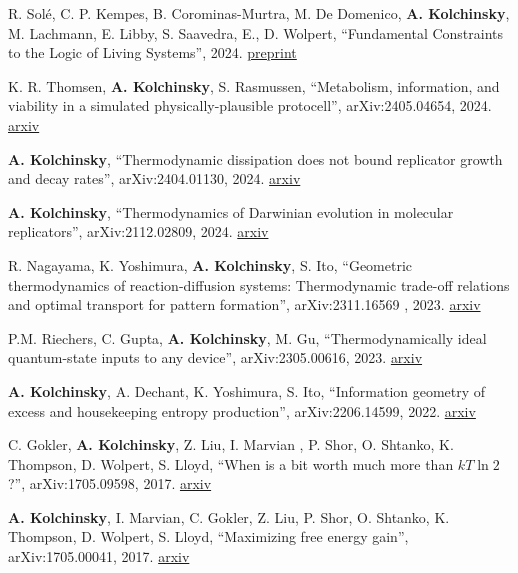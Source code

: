 
R. Solé, C. P. Kempes, B. Corominas-Murtra, M. De Domenico, \textbf{A. Kolchinsky}, M. Lachmann, E. Libby, S. Saavedra, E., D. Wolpert, ``Fundamental Constraints to the Logic of Living Systems'', 2024. \href{https://www.preprints.org/manuscript/202406.0891/v1}{preprint}

K. R. Thomsen, \textbf{A. Kolchinsky}, S. Rasmussen, ``Metabolism, information, and viability in a simulated physically-plausible protocell'', arXiv:2405.04654, 2024. \href{http://arxiv.org/abs/2405.04654}{arxiv}

\textbf{A. Kolchinsky}, ``Thermodynamic dissipation does not bound replicator growth and decay rates'', arXiv:2404.01130, 2024. \href{http://arxiv.org/abs/2404.01130}{arxiv} 

\textbf{A. Kolchinsky}, ``Thermodynamics of Darwinian evolution in molecular replicators'', arXiv:2112.02809, 2024. \href{http://arxiv.org/abs/2112.02809}{arxiv} 

R. Nagayama, K. Yoshimura, \textbf{A. Kolchinsky}, S. Ito, ``Geometric thermodynamics of reaction-diffusion systems: Thermodynamic trade-off relations and optimal transport for pattern formation'', arXiv:2311.16569 , 2023. \href{https://arxiv.org/abs/2311.16569}{arxiv}
 
P.M. Riechers, C. Gupta, \textbf{A. Kolchinsky}, M. Gu, ``Thermodynamically ideal quantum-state inputs to any device'', arXiv:2305.00616, 2023. \href{http://arxiv.org/abs/2305.00616}{arxiv}

\textbf{A. Kolchinsky}, A. Dechant, K. Yoshimura, S. Ito, 
``Information geometry of excess and housekeeping entropy production'', arXiv:2206.14599, 2022. \href{https://arxiv.org/abs/2206.14599}{arxiv}

C. Gokler, \textbf{A. Kolchinsky}, Z. Liu, I. Marvian , P. Shor, O. Shtanko, K. Thompson, D. Wolpert, S. Lloyd, ``When is a bit worth much more than $kT \ln 2$?'', arXiv:1705.09598, 2017. \href{https://arxiv.org/abs/1705.09598}{arxiv}

\textbf{A. Kolchinsky}, I. Marvian, C. Gokler, Z. Liu, P. Shor, O. Shtanko, K. Thompson, D. Wolpert, S. Lloyd, ``Maximizing free energy gain'', arXiv:1705.00041, 2017. \href{https://arxiv.org/abs/1705.00041}{arxiv}

